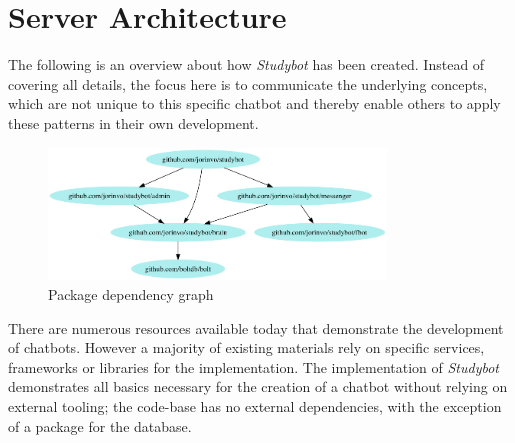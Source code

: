 \section{Server Architecture}


The following is an overview about how \emph{Studybot} has been created.
Instead of covering all details, the focus here is to communicate the underlying concepts,
which are not unique to this specific chatbot and thereby enable others to apply these patterns in their own development.
\\

\begin{figure}[h]
  \centering
  \includegraphics[width=0.8\textwidth]{images/internal-deps.png}
  \caption{Package dependency graph\protect\footnotemark}
	\label{fig:internal-deps}
\end{figure}

There are numerous resources available today that demonstrate the development of chatbots.
However a majority of existing materials rely on specific services, frameworks or libraries for the implementation.
The implementation of \emph{Studybot} demonstrates all basics necessary for the creation of a chatbot
without relying on external tooling;
the code-base has no external dependencies, with the exception of a package for the database.
\\

